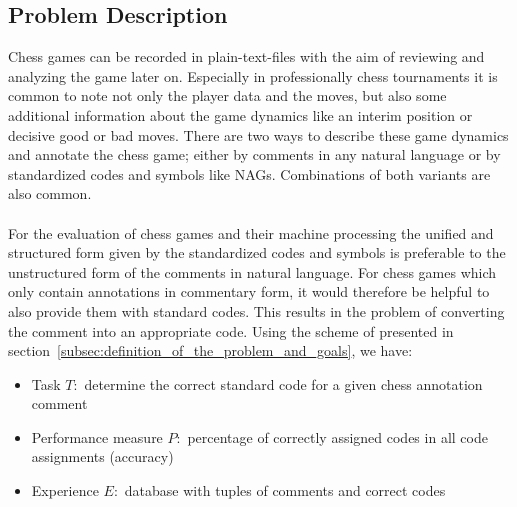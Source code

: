 \documentclass[article,type=msc,colorback,accentcolor=tud7b]{tudthesis}
\begin{document}
  \subsection{Problem Description}
    Chess games can be recorded in plain-text-files with the aim of reviewing and analyzing the game later on. Especially in professionally chess tournaments it is common to note not only the player data and the moves, but also some additional information about the game dynamics like an interim position or decisive good or bad moves. There are two ways to describe these game dynamics and annotate the chess game; either by comments in any natural language or by standardized codes and symbols like NAGs. Combinations of both variants are also common. \\\\
    For the evaluation of chess games and their machine processing the unified and structured form given by the standardized codes and symbols is preferable to the unstructured form of the comments in natural language. For chess games which only contain annotations in commentary form, it would therefore be helpful to also provide them with standard codes. This results in the problem of converting the comment into an appropriate code. Using the scheme of \citeauthor{Mitchell1997} presented in section~\ref{subsec:definition_of_the_problem_and_goals}, we have:
    \begin{itemize}[noitemsep]
      \item Task $T:$ determine the correct standard code for a given chess annotation comment
      \item Performance measure $P:$ percentage of correctly assigned codes in all code assignments (accuracy)
      \item Experience $E:$ database with tuples of comments and correct codes
    \end{itemize}
      
\end{document}
